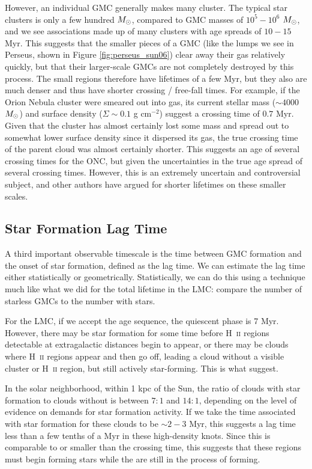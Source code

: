 However, an individual GMC generally makes many cluster. The typical star clusters is only a few hundred $M_{\odot}$, compared to GMC masses of $10^5-10^6$ $M_{\odot}$, and we see associations made up of many clusters with age spreads of $10-15$ Myr. This suggests that the smaller pieces of a GMC (like the lumps we see in Perseus, shown in Figure \ref{fig:perseus_sun06}) clear away their gas relatively quickly, but that their larger-scale GMCs are not completely destroyed by this process.  The small regions therefore have lifetimes of a few Myr, but they also are much denser and thus have shorter crossing / free-fall times. For example, if the Orion Nebula cluster were smeared out into gas, its current stellar mass ($\sim 4000$ $M_{\odot}$) and surface density ($\Sigma \sim 0.1$ g cm$^{-2}$) suggest a crossing time of $0.7$ Myr. Given that the cluster has almost certainly lost some mass and spread out to somewhat lower surface density since it dispersed its gas, the true crossing time of the parent cloud was almost certainly shorter. This suggests an age of several crossing times for the ONC, but given the uncertainties in the true age spread of several crossing times. However, this is an extremely uncertain and controversial subject, and other authors have argued for shorter lifetimes on these smaller scales.

\subsection{Star Formation Lag Time}

A third important observable timescale is the time between GMC formation and the onset of star formation, defined as the lag time. We can estimate the lag time either statistically or geometrically. Statistically, we can do this using a technique much like what we did for the total lifetime in the LMC: compare the number of starless GMCs to the number with stars.

For the LMC, if we accept the \citet{kawamura09a} age sequence, the quiescent phase is 7 Myr. However, there may be star formation for some time before H~\textsc{ii} regions detectable at extragalactic distances begin to appear, or there may be clouds where H~\textsc{ii} regions appear and then go off, leading a cloud without a visible cluster or H~\textsc{ii} region, but still actively star-forming. This is what \citet{goldbaum11a} suggest.

In the solar neighborhood, within 1 kpc of the Sun, the ratio of clouds with star formation to clouds without is between $7:1$ and $14:1$, depending on the level of evidence on demands for star formation activity. If we take the time associated with star formation for these clouds to be $\sim 2-3$ Myr, this suggests a lag time less than a few tenths of a Myr in these high-density knots. Since this is comparable to or smaller than the crossing time, this suggests that these regions must begin forming stars while the are still in the process of forming.

